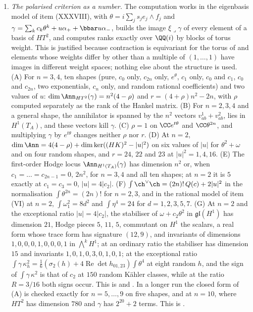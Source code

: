 \begin{enumerate}[label=\textup{(\Roman*)},leftmargin=*]
\item \emph{The polarised criterion as a number.} The computation works in
  the eigenbasis model of item (XXXVIII), with
  $\theta=i\sum_{j}s_{j}e_{j}\wedge f_{j}$ and
  $\gamma=\sum_{k}c_{k}\theta^{k}+u\alpha_{+}+\bbar u\alpha_{-}$, builds the
  image $\xi\lrcorner\gamma$ of every element of a basis of $HT^{2}$, and
  computes ranks exactly over $\QQ(i)$ by blocks of torus weight. This is
  justified because contraction is equivariant for the torus of
   and elements whose weights differ by other than a
  multiple of $(1,\dots,1)$ have images in different weight spaces; nothing
  else about the structure is used. (A) For $n=3,4$, ten shapes (pure, $c_{0}$
  only, $c_{2n}$ only, $e^{\theta}$, $c_{1}$ only, $c_{0}$ and $c_{1}$, $c_{0}$
  and $c_{2n}$, two exponentials, $c_{n}$ only, and random rational
  coefficients) and two values of $u$: $\dim\Ann_{HT^{2}}(\gamma)=n^{2}(4-\rho)$
  and $r=(4+\rho)n^{2}-2n$, with $\rho$ computed separately as the rank of the
  Hankel matrix. (B) For $n=2,3,4$ and a general shape, the annihilator is
  spanned by the $n^{2}$ vectors $v^{1}_{ab}+v^{2}_{ab}$, lies in $H^{1}(T_{A})$,
  and these vectors kill $\gamma$. (C) $\rho=1$ on $\CC e^{t\theta}$ and
  $\CC\theta^{2n}$, and multiplying $\gamma$ by $e^{t\theta}$ changes neither
  $\rho$ nor $r$. (D) At $n=2$, $\dim\Ann=4(4-\rho)+\dim\ker((HK)^{2}-|u|^{2})$
  on six values of $|u|$ for $\theta^{2}+\omega$ and on four random shapes, and
  $r=24$, $22$ and $23$ at $|u|^{2}=1,4,16$. (E) The first-order Hodge locus
  $\Ann_{H^{1}(T_{A})}(\gamma)$ has dimension $n^{2}$ or, when
  $c_{1}=\dots=c_{2n-1}=0$, $2n^{2}$, for $n=3,4$ and all ten shapes; at $n=2$
  it is $5$ exactly at $c_{1}=c_{3}=0$, $|u|=4|c_{2}|$. (F)
  $\int\ch^{\vee}\ch=(2n)!\,Q(c)+2|u|^{2}$ in the normalisation
  $\int\theta^{2n}=(2n)!$ for $n=2,3$, and in the rational model of item (VI)
  at $n=2$, $\int\omega_{1}^{2}=8d^{2}$ and
  $\int\eta^{4}=24$ for $d=1,2,3,5,7$. (G) At $n=2$ and the exceptional
  ratio $|u|=4|c_{2}|$, the stabiliser of $\omega+c_{2}\theta^{2}$ in
  $\mathfrak{gl}(H^{1})$ has dimension $21$, Hodge pieces $5$, $11$, $5$,
  commutant on $H^{1}$ the scalars, a real form whose trace form has
  signature $(12,9)$, and invariants of dimensions $1,0,0,0,1,0,0,0,1$ in
  $\bigwedge^{k}H^{1}$; at an ordinary ratio the stabiliser has dimension $15$
  and invariants $1,0,1,0,3,0,1,0,1$; at the exceptional ratio
  $\int\gamma\,\kappa_{h}^{2}=\frac16(\sigma_{2}(h)+4\operatorname{Re}\det
  h_{01,23})\int\theta^{4}$ at eight random $h$, and the sign of
  $\int\gamma\,\kappa^{2}$ is that of $c_{2}$ at $150$ random K\"ahler
  classes, while at the ratio $R=3/16$ both signs occur. This is
   and . In a longer
  run the closed form of (A) is checked exactly for $n=5,\dots,9$ on five
  shapes, and at $n=10$, where $HT^{2}$ has dimension $780$ and $\gamma$ has
  $2^{20}+2$ terms. This is .


\end{enumerate}
